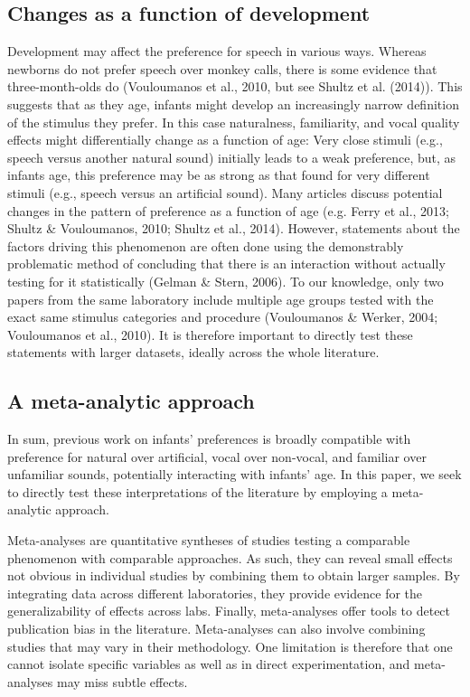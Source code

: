 \documentclass[man]{apa6}
\begin{document}
\subsection{Changes as a function of
development}\label{changes-as-a-function-of-development}

Development may affect the preference for speech in various ways.
Whereas newborns do not prefer speech over monkey calls, there is some
evidence that three-month-olds do (Vouloumanos et al., 2010, but see
Shultz et al. (2014)). This suggests that as they age, infants might
develop an increasingly narrow definition of the stimulus they prefer.
In this case naturalness, familiarity, and vocal quality effects might
differentially change as a function of age: Very close stimuli (e.g.,
speech versus another natural sound) initially leads to a weak
preference, but, as infants age, this preference may be as strong as
that found for very different stimuli (e.g., speech versus an artificial
sound). Many articles discuss potential changes in the pattern of
preference as a function of age (e.g. Ferry et al., 2013; Shultz \&
Vouloumanos, 2010; Shultz et al., 2014). However, statements about the
factors driving this phenomenon are often done using the demonstrably
problematic method of concluding that there is an interaction without
actually testing for it statistically (Gelman \& Stern, 2006). To our
knowledge, only two papers from the same laboratory include multiple age
groups tested with the exact same stimulus categories and procedure
(Vouloumanos \& Werker, 2004; Vouloumanos et al., 2010). It is therefore
important to directly test these statements with larger datasets,
ideally across the whole literature.

\subsection{A meta-analytic approach}\label{a-meta-analytic-approach}

In sum, previous work on infants' preferences is broadly compatible with
preference for natural over artificial, vocal over non-vocal, and
familiar over unfamiliar sounds, potentially interacting with infants'
age. In this paper, we seek to directly test these interpretations of
the literature by employing a meta-analytic approach.

Meta-analyses are quantitative syntheses of studies testing a comparable
phenomenon with comparable approaches. As such, they can reveal small
effects not obvious in individual studies by combining them to obtain
larger samples. By integrating data across different laboratories, they
provide evidence for the generalizability of effects across labs.
Finally, meta-analyses offer tools to detect publication bias in the
literature. Meta-analyses can also involve combining studies that may
vary in their methodology. One limitation is therefore that one cannot
isolate specific variables as well as in direct experimentation, and
meta-analyses may miss subtle effects.
\end{document}

